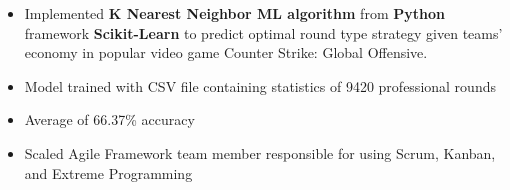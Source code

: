 







\smallskip
\begin{itemize}
\item Implemented \textbf{K Nearest Neighbor ML algorithm} from \textbf{Python} framework \textbf{Scikit-Learn} to predict optimal round type strategy given teams' economy in popular video game Counter Strike: Global Offensive.
\smallskip
\item Model trained with CSV file containing statistics of 9420 professional rounds
\smallskip
\item Average of 66.37\% accuracy
\end{itemize}



\divider\smallskip


\divider\smallskip





\begin{itemize}
\item Scaled Agile Framework team member responsible for using Scrum, Kanban, and Extreme Programming
\end{itemize}







\divider

